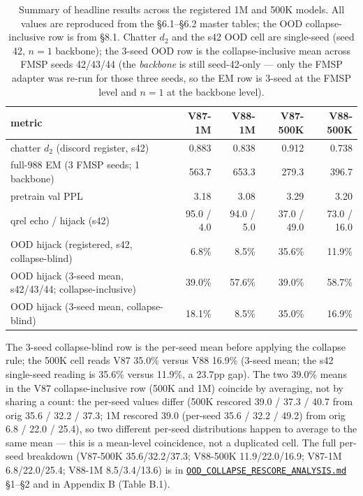 \documentclass[11pt]{article}
\begin{document}
\begin{table}[!t]
\small
\caption{Summary of headline results across the registered 1M and 500K models. All values are reproduced from the \S6.1--\S6.2 master tables; the OOD collapse-inclusive row is from \S8.1. Chatter $d_2$ and the s42 OOD cell are single-seed (seed 42, $n=1$ backbone); the 3-seed OOD row is the collapse-inclusive mean across FMSP seeds 42/43/44 (the \emph{backbone} is still seed-42-only --- only the FMSP adapter was re-run for those three seeds, so the EM row is 3-seed at the FMSP level and $n=1$ at the backbone level).}
\label{tab:headline}
\centering
\begin{tabular}{lrrrr}
\toprule
metric & V87-1M & V88-1M & V87-500K & V88-500K \\
\midrule
chatter $d_2$ (discord register, s42) & 0.883 & 0.838 & 0.912 & 0.738 \\
full-988 EM (3 FMSP seeds; 1 backbone) & 563.7 & 653.3 & 279.3 & 396.7 \\
pretrain val PPL & 3.18 & 3.08 & 3.29 & 3.20 \\
qrel echo / hijack (s42) & 95.0 / 4.0 & 94.0 / 5.0 & 37.0 / 49.0 & 73.0 / 16.0 \\
OOD hijack (registered, s42, collapse-blind) & 6.8\% & 8.5\% & 35.6\% & 11.9\% \\
OOD hijack (3-seed mean, s42/43/44; collapse-inclusive) & 39.0\% & 57.6\% & 39.0\% & 58.7\% \\
OOD hijack (3-seed mean, collapse-blind) & 18.1\% & 8.5\% & 35.0\% & 16.9\% \\
\bottomrule
\end{tabular}
\end{table}

The 3-seed collapse-blind row is the per-seed mean before applying the collapse rule; the 500K cell reads V87 35.0\% versus V88 16.9\% (3-seed mean; the s42 single-seed reading is 35.6\% versus 11.9\%, a 23.7pp gap). The two 39.0\% means in the V87 collapse-inclusive row (500K and 1M) coincide by averaging, not by sharing a count: the per-seed values differ (500K rescored 39.0 / 37.3 / 40.7 from orig 35.6 / 32.2 / 37.3; 1M rescored 39.0 (per-seed 35.6 / 32.2 / 49.2) from orig 6.8 / 22.0 / 25.4), so two different per-seed distributions happen to average to the same mean --- this is a mean-level coincidence, not a duplicated cell. The full per-seed breakdown (V87-500K 35.6/32.2/37.3; V88-500K 11.9/22.0/16.9; V87-1M 6.8/22.0/25.4; V88-1M 8.5/3.4/13.6) is in \href{https://github.com/llaa33219/MicroMixer-4/blob/4bb630413dfa58ef3141291e121ab8c006d03235/OOD_COLLAPSE_RESCORE_ANALYSIS.md}{\texttt{OOD\_COLLAPSE\_RESCORE\_ANALYSIS.md}} \S1--\S2 and in Appendix B (Table B.1).
\end{document}
